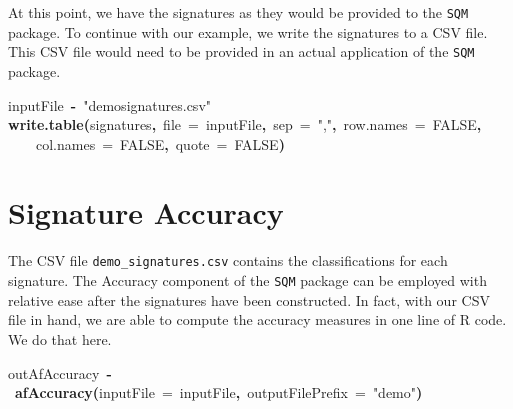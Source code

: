 \documentclass{article}
\makeatletter
\newcommand{\hlnumber}[1]{\textcolor[rgb]{0,0,0}{#1}}%
\newcommand{\hlfunctioncall}[1]{\textcolor[rgb]{.5,0,.33}{\textbf{#1}}}%
\newcommand{\hlstring}[1]{\textcolor[rgb]{.6,.6,1}{#1}}%
\newcommand{\hlkeyword}[1]{\textbf{#1}}%
\newcommand{\hlargument}[1]{\textcolor[rgb]{.69,.25,.02}{#1}}%
\newcommand{\hlassignement}[1]{\textbf{#1}}%
\newcommand{\hlsymbol}[1]{#1}%
\newcommand{\hlstd}[1]{\textcolor[rgb]{0,0,0}{#1}}%
\newenvironment{kframe}{%
 \def\FrameCommand##1{\hskip\@totalleftmargin \hskip-\fboxsep
 \colorbox{shadecolor}{##1}\hskip-\fboxsep
     \hskip-\linewidth \hskip-\@totalleftmargin \hskip\columnwidth}%
 \MakeFramed {\advance\hsize-\width
   \@totalleftmargin\z@ \linewidth\hsize
   \@setminipage}}%
 {\par\unskip\endMakeFramed}
\newenvironment{knitrout}{}{} %
\makeatother
\begin{document}
At this point, we have the signatures as they would be provided to the {\tt SQM}
package. To continue with our example, we write the signatures to a CSV file.
This CSV file would need to be provided in an actual application of the {\tt SQM}
package.

\begin{knitrout}
\color{fgcolor}\begin{kframe}
\begin{flushleft}
\ttfamily\noindent
\hlsymbol{inputFile}{\ }\hlassignement{\usebox{\hlnormalsizeboxlessthan}-}{\ }\hlstring{"{}demo\usebox{\hlnormalsizeboxunderscore}signatures.csv"{}}\hspace*{\fill}\\
\hlstd{}\hlfunctioncall{write.table}\hlkeyword{(}\hlsymbol{signatures}\hlkeyword{,}{\ }\hlargument{file}{\ }\hlargument{=}{\ }\hlsymbol{inputFile}\hlkeyword{,}{\ }\hlargument{sep}{\ }\hlargument{=}{\ }\hlstring{"{},"{}}\hlkeyword{,}{\ }\hlargument{row.names}{\ }\hlargument{=}{\ }\hlnumber{FALSE}\hlkeyword{,}\hspace*{\fill}\\
\hlstd{}{\ }{\ }{\ }{\ }\hlargument{col.names}{\ }\hlargument{=}{\ }\hlnumber{FALSE}\hlkeyword{,}{\ }\hlargument{quote}{\ }\hlargument{=}{\ }\hlnumber{FALSE}\hlkeyword{)}\mbox{}
\normalfont
\end{flushleft}
\end{kframe}
\end{knitrout}


\section{Signature Accuracy}

The CSV file {\tt demo\_signatures.csv} contains the classifications for each
signature. The Accuracy component of the {\tt SQM} package can be employed with
relative ease after the signatures have been constructed. In fact, with our CSV
file in hand, we are able to compute the accuracy measures in one line of R
code. We do that here.

\begin{knitrout}
\color{fgcolor}\begin{kframe}
\begin{flushleft}
\ttfamily\noindent
\hlsymbol{outAfAccuracy}{\ }\hlassignement{\usebox{\hlnormalsizeboxlessthan}-}{\ }\hlfunctioncall{afAccuracy}\hlkeyword{(}\hlargument{inputFile}{\ }\hlargument{=}{\ }\hlsymbol{inputFile}\hlkeyword{,}{\ }\hlargument{outputFilePrefix}{\ }\hlargument{=}{\ }\hlstring{"{}demo"{}}\hlkeyword{)}\mbox{}
\normalfont
\end{flushleft}
\end{kframe}
\end{knitrout}
\end{document}
